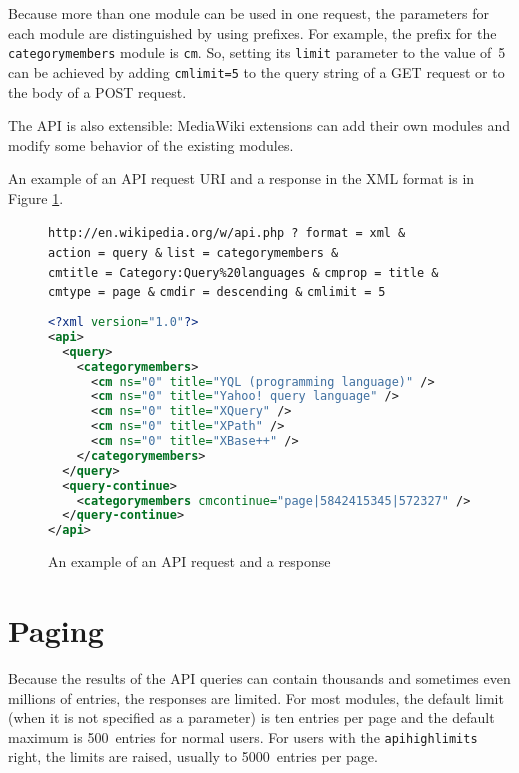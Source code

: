 Because more than one module can be used in one request,
the parameters for each module are distinguished by using prefixes.
For example, the prefix for the \texttt{categorymembers} module is \texttt{cm}.
So, setting its \texttt{limit} parameter to the value of~5 can be achieved by
adding \texttt{cmlimit=5} to the query string of a GET request or to the body of a POST request.

The API is also extensible: MediaWiki extensions can add their own modules and modify some behavior of the existing modules.

An example of an API request URI and a response in the XML format is in Figure \ref{API example}.


\begin{figure}[htbp]
\texttt{http://en.wikipedia.org/w/api.php}~\texttt{?}\
\texttt{format}~\texttt{=}~\texttt{xml}~\texttt{\&}
\texttt{action}~\texttt{=}~\texttt{query}~\texttt{\&}
\texttt{list}~\texttt{=}~\texttt{categorymembers}~\texttt{\&}
\texttt{cmtitle}~\texttt{=}~\texttt{Category:Query\%20languages}~\texttt{\&}
\texttt{cmprop}~\texttt{=}~\texttt{title}~\texttt{\&}
\texttt{cmtype}~\texttt{=}~\texttt{page}~\texttt{\&}
\texttt{cmdir}~\texttt{=}~\texttt{descending}~\texttt{\&}
\texttt{cmlimit}~\texttt{=}~\texttt{5}

\begin{lstlisting}[language=xml]
<?xml version="1.0"?>
<api>
  <query>
    <categorymembers>
      <cm ns="0" title="YQL (programming language)" />
      <cm ns="0" title="Yahoo! query language" />
      <cm ns="0" title="XQuery" />
      <cm ns="0" title="XPath" />
      <cm ns="0" title="XBase++" />
    </categorymembers>
  </query>
  <query-continue>
    <categorymembers cmcontinue="page|5842415345|572327" />
  </query-continue>
</api>
\end{lstlisting}

\caption{An example of an API request and a response}
\label{API example}
\end{figure}

\section{Paging}

Because the results of the API queries can contain thousands and sometimes even millions of entries,
the responses are limited.
For most modules, the default limit (when it is not specified as a parameter) is ten entries per page
and the default maximum is 500~entries for normal users.
For users with the \texttt{apihighlimits} right, the limits are raised, usually to 5000~entries per page.

